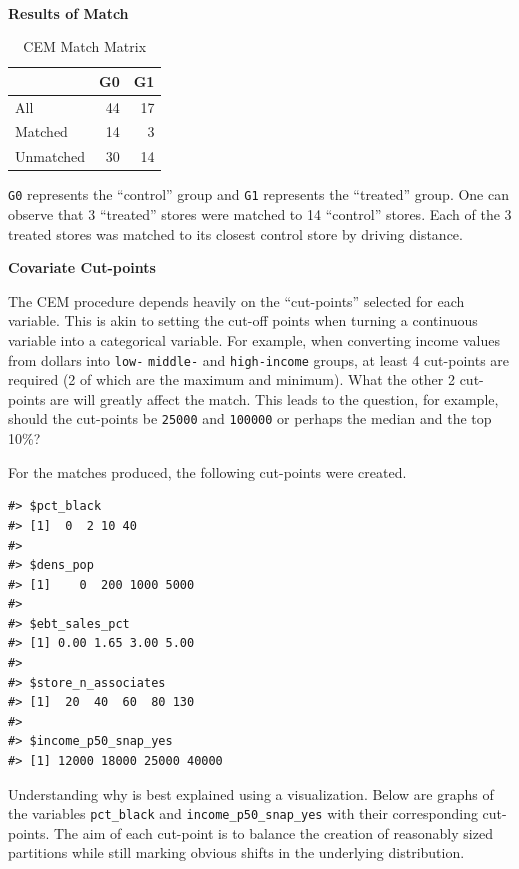 \documentclass[12pt,letterpaperpaper,]{book}
\begin{document}
~

\textbf{Results of Match}

\begin{table}

\caption{\label{tab:match-results}CEM Match Matrix}
\centering
\begin{tabular}[t]{lrr}
\toprule
  & G0 & G1\\
\midrule
All & 44 & 17\\
Matched & 14 & 3\\
Unmatched & 30 & 14\\
\bottomrule
\end{tabular}
\end{table}

\texttt{G0} represents the ``control'' group and \texttt{G1} represents
the ``treated'' group. One can observe that 3 ``treated'' stores were
matched to 14 ``control'' stores. Each of the 3 treated stores was
matched to its closest control store by driving distance.

\textbf{Covariate Cut-points}

The CEM procedure depends heavily on the ``cut-points'' selected for
each variable. This is akin to setting the cut-off points when turning a
continuous variable into a categorical variable. For example, when
converting income values from dollars into \texttt{low-}
\texttt{middle-} and \texttt{high-income} groups, at least 4 cut-points
are required (2 of which are the maximum and minimum). What the other 2
cut-points are will greatly affect the match. This leads to the
question, for example, should the cut-points be \texttt{25000} and
\texttt{100000} or perhaps the median and the top 10\%?

For the matches produced, the following cut-points were created.

\begin{verbatim}
#> $pct_black
#> [1]  0  2 10 40
#> 
#> $dens_pop
#> [1]    0  200 1000 5000
#> 
#> $ebt_sales_pct
#> [1] 0.00 1.65 3.00 5.00
#> 
#> $store_n_associates
#> [1]  20  40  60  80 130
#> 
#> $income_p50_snap_yes
#> [1] 12000 18000 25000 40000
\end{verbatim}

Understanding why is best explained using a visualization. Below are
graphs of the variables \texttt{pct\_black} and
\texttt{income\_p50\_snap\_yes} with their corresponding cut-points. The
aim of each cut-point is to balance the creation of reasonably sized
partitions while still marking obvious shifts in the underlying
distribution.
\end{document}
